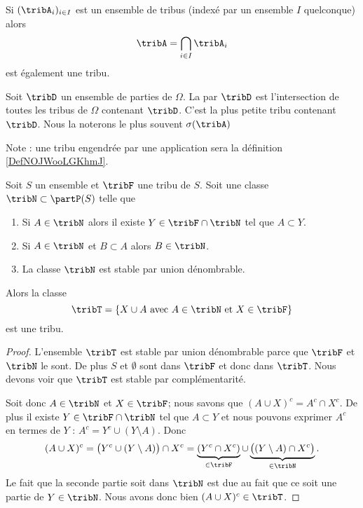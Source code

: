 Si \( (\tribA_i)_{i\in I}\) est un ensemble de tribus (indexé par un ensemble \( I\) quelconque) alors 
\begin{equation}
    \tribA=\bigcap_{i\in I}\tribA_i
\end{equation}
est également une tribu.

\begin{definition}
    Soit \( \tribD\) un ensemble de parties de \( \Omega\). La  par \( \tribD\) est l'intersection de toutes les tribus de \( \Omega\) contenant \( \tribD\). C'est la plus petite tribu contenant \( \tribD\). Nous la noterons le plus souvent \( \sigma(\tribA)\)
\end{definition}

Note : une tribu engendrée par une application sera la définition \ref{DefNOJWooLGKhmJ}.

\begin{proposition}  \label{PropHYLooLgOCy}
    Soit \( S\) un ensemble et \( \tribF\) une tribu de \( S\). Soit une classe \( \tribN\subset\partP(S)\) telle que
    \begin{enumerate}
        \item
            Si \( A\in\tribN\) alors il existe \( Y\in\tribF\cap\tribN\) tel que \( A\subset Y\).
        \item
            Si \( A\in\tribN\) et \( B\subset A\) alors \( B\in\tribN\).
        \item
            La classe \( \tribN\) est stable par union dénombrable.
    \end{enumerate}
    Alors la classe
    \begin{equation}
        \tribT=\{ X\cup A\text{ avec \( A\in\tribN\) et \( X\in\tribF\)} \}
    \end{equation}
    est une tribu.
\end{proposition}

\begin{proof}
    L'ensemble \( \tribT\) est stable par union dénombrable parce que \( \tribF\) et \( \tribN\) le sont. De plus \( S\) et \( \emptyset\) sont dans \( \tribF\) et donc dans \( \tribT\). Nous devons voir que \( \tribT\) est stable par complémentarité.

    Soit donc \( A\in\tribN\) et \( X\in\tribF\); nous savons que \( (A\cup X)^c=A^c\cap X^c\). De plus il existe \( Y\in\tribF\cap\tribN\) tel que \( A\subset Y\) et nous pouvons exprimer \( A^c\) en termes de \( Y\) : \( A^c=Y^c\cup(Y\setminus A)\). Donc
    \begin{equation}
        (A\cup X)^c=\big( Y^c\cup(Y\setminus A) \big)\cap X^c=\underbrace{(Y^c\cap X^c)}_{\in\tribF}\cup\underbrace{\big( (Y\setminus A)\cap X^c \big)}_{\in\tribN}.
    \end{equation}
    Le fait que la seconde partie soit dans \( \tribN\) est due au fait que ce soit une partie de \( Y\in\tribN\). Nous avons donc bien \( (A\cup X)^c\in\tribT\).
\end{proof}


